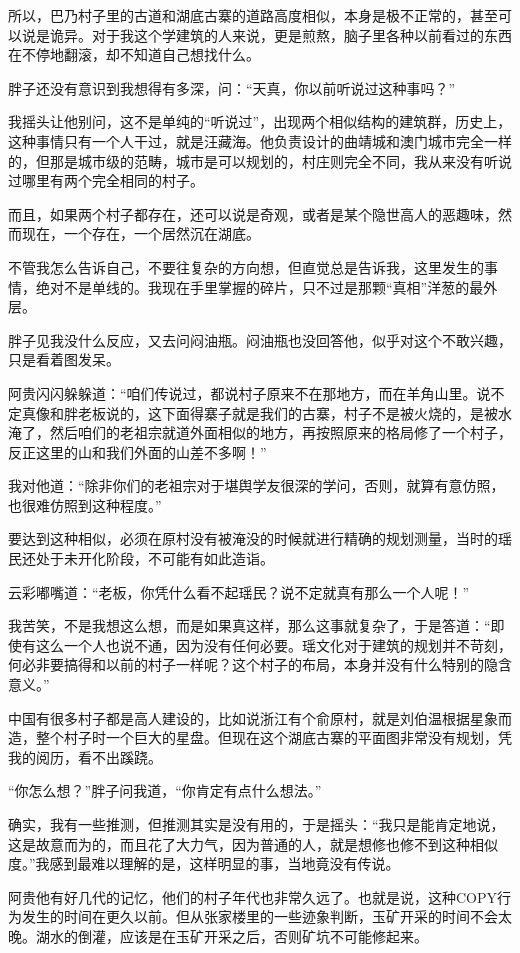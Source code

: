 所以，巴乃村子里的古道和湖底古寨的道路高度相似，本身是极不正常的，甚至可以说是诡异。对于我这个学建筑的人来说，更是煎熬，脑子里各种以前看过的东西在不停地翻滚，却不知道自己想找什么。

胖子还没有意识到我想得有多深，问：“天真，你以前听说过这种事吗？”

我摇头让他别问，这不是单纯的“听说过”，出现两个相似结构的建筑群，历史上，这种事情只有一个人干过，就是汪藏海。他负责设计的曲靖城和澳门城市完全一样的，但那是城市级的范畴，城市是可以规划的，村庄则完全不同，我从来没有听说过哪里有两个完全相同的村子。

而且，如果两个村子都存在，还可以说是奇观，或者是某个隐世高人的恶趣味，然而现在，一个存在，一个居然沉在湖底。

不管我怎么告诉自己，不要往复杂的方向想，但直觉总是告诉我，这里发生的事情，绝对不是单线的。我现在手里掌握的碎片，只不过是那颗“真相”洋葱的最外层。

胖子见我没什么反应，又去问闷油瓶。闷油瓶也没回答他，似乎对这个不敢兴趣，只是看着图发呆。

阿贵闪闪躲躲道：“咱们传说过，都说村子原来不在那地方，而在羊角山里。说不定真像和胖老板说的，这下面得寨子就是我们的古寨，村子不是被火烧的，是被水淹了，然后咱们的老祖宗就道外面相似的地方，再按照原来的格局修了一个村子，反正这里的山和我们外面的山差不多啊！”

我对他道：“除非你们的老祖宗对于堪舆学友很深的学问，否则，就算有意仿照，也很难仿照到这种程度。”

要达到这种相似，必须在原村没有被淹没的时候就进行精确的规划测量，当时的瑶民还处于未开化阶段，不可能有如此造诣。

云彩嘟嘴道：“老板，你凭什么看不起瑶民？说不定就真有那么一个人呢！”

我苦笑，不是我想这么想，而是如果真这样，那么这事就复杂了，于是答道：“即使有这么一个人也说不通，因为没有任何必要。瑶文化对于建筑的规划并不苛刻，何必非要搞得和以前的村子一样呢？这个村子的布局，本身并没有什么特别的隐含意义。”

中国有很多村子都是高人建设的，比如说浙江有个俞原村，就是刘伯温根据星象而造，整个村子时一个巨大的星盘。但现在这个湖底古寨的平面图非常没有规划，凭我的阅历，看不出蹊跷。

“你怎么想？”胖子问我道，“你肯定有点什么想法。”

确实，我有一些推测，但推测其实是没有用的，于是摇头：“我只是能肯定地说，这是故意而为的，而且花了大力气，因为普通的人，就是想修也修不到这种相似度。”我感到最难以理解的是，这样明显的事，当地竟没有传说。

阿贵他有好几代的记忆，他们的村子年代也非常久远了。也就是说，这种COPY行为发生的时间在更久以前。但从张家楼里的一些迹象判断，玉矿开采的时间不会太晚。湖水的倒灌，应该是在玉矿开采之后，否则矿坑不可能修起来。

